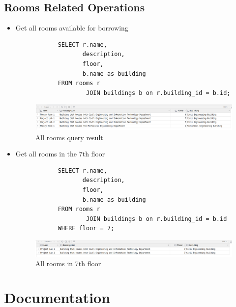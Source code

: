 \documentclass[12pt,titlepage]{article}
\begin{document}
\subsection{Rooms Related Operations}
\begin{itemize}
    \item {
        Get all rooms available for borrowing

        \begin{verbatim}
            SELECT r.name,
                   description,
                   floor,
                   b.name as building
            FROM rooms r
                    JOIN buildings b on r.building_id = b.id;
        \end{verbatim}

        \begin{figure}[h]
            \centering
            \includegraphics[width=\textwidth]{images/all-rooms-query.png}
            \caption{All rooms query result}
        \end{figure}
    }
    \item {
        Get all rooms in the 7th floor

        \begin{verbatim}
            SELECT r.name,
                   description,
                   floor,
                   b.name as building
            FROM rooms r
                    JOIN buildings b on r.building_id = b.id
            WHERE floor = 7;
        \end{verbatim}

        \begin{figure}[h]
            \centering
            \includegraphics[width=\textwidth]{images/7th-floor-query.png}
            \caption{All rooms in 7th floor}
        \end{figure}
    }
\end{itemize}

\pagebreak

\section{Documentation}
\end{document}
